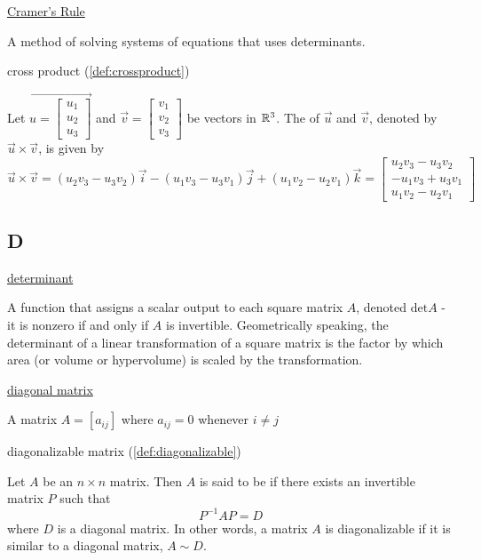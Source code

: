 \documentclass{ximera}
\begin{document}
\href{https://ximera.osu.edu/linearalgebradzv3/LinearAlgebraInteractiveIntro/DET-0060/main}{Cramer's Rule}
\begin{expandable}{}{}
    A method of solving systems of equations that uses determinants.
\end{expandable}

cross product (\ref{def:crossproduct})
\begin{expandable}{}{}
    Let $\vec{u=\begin{bmatrix}u_1\\u_2\\u_3\end{bmatrix}}$ and $\vec{v}=\begin{bmatrix}v_1\\v_2\\v_3\end{bmatrix}$ be vectors in $\mathbb{R}^3$.  The  of $\vec{u}$ and $\vec{v}$, denoted by $\vec{u}\times\vec{v}$, is given by
$$\vec{u}\times\vec{v}=(u_2v_3-u_3v_2)\vec{i}-(u_1v_3-u_3v_1)\vec{j}+(u_1v_2-u_2v_1)\vec{k}
=\begin{bmatrix}u_2v_3-u_3v_2\\-u_1v_3+u_3v_1\\u_1v_2-u_2v_1\end{bmatrix}$$
\end{expandable}

\subsection*{D}
\href{https://ximera.osu.edu/linearalgebradzv3/LinearAlgebraInteractiveIntro/MAT-0025/main}{determinant}
\begin{expandable}{}{}
    A function that assigns a scalar output to each square matrix $A$, denoted $\mbox{det} A$ - it is nonzero if and only if $A$ is invertible.  Geometrically speaking, the determinant of a linear transformation of a square matrix is the factor by which area (or volume or hypervolume) is scaled by the transformation.
\end{expandable}

\href{https://ximera.osu.edu/linearalgebradzv3/LinearAlgebraInteractiveIntro/MAT-0025/main}{diagonal matrix}
\begin{expandable}{}{}
    A matrix $A=[a_{ij}]$  where $a_{ij}=0$ whenever $i \ne j$
\end{expandable}

diagonalizable matrix (\ref{def:diagonalizable})
\begin{expandable}{}{}
    Let $A$ be an $n\times n$ matrix. Then $A$ is said to be  if there exists an invertible matrix $P$ such that
\begin{equation*}
P^{-1}AP=D
\end{equation*}
where $D$ is a diagonal matrix.  In other words, a matrix $A$ is diagonalizable if it is similar to a diagonal matrix, $A \sim D$.
\end{expandable}
\end{document}

